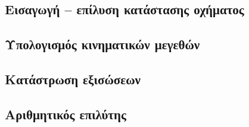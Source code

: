 \subsection{Εισαγωγή -- επίλυση κατάστασης οχήματος}

\label{subsec:stateSolverIntro}
\subsection{Υπολογισμός κινηματικών μεγεθών}
\label{subsec:stateSolverVelocities}

\subsection{Κατάστρωση εξισώσεων}
\label{subsec:stateSolverEquations}

\subsection{Αριθμητικός επιλύτης}
\label{subsec:stateSolverNumerical}

